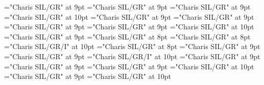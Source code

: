 \documentclass[gps1,twoside]{article}
\begin{document}
\font\pronunciationssubentrysubentriesentryletData="Charis SIL/GR" at 9pt
\font\pronunciationpronunciationssubentrysubentriesentryletData="Charis SIL/GR" at 9pt
\font\formpronunciationpronunciationssubentrysubentriesentryletData="Charis SIL/GR" at 9pt
\font\spanbzhfonipaformpronunciationpronunciationssubentrysubentriesentryletData="Charis SIL/GR" at 10pt
\font\sensessubentrysubentriesentryletData="Charis SIL/GR" at 9pt
\font\sensecontentsensessubentrysubentriesentryletData="Charis SIL/GR" at 9pt
\font\sensesensecontentsensessubentrysubentriesentryletData="Charis SIL/GR" at 9pt
\font{}="Charis SIL/GR" at 9pt
\font\spanendefinitionorglosssensesensecontentsensessubentrysubentriesentryletData="Charis SIL/GR" at 10pt
\font\examplessensesensecontentsensessubentrysubentriesentryletData="Charis SIL/GR" at 9pt
\font\exampleexamplessensesensecontentsensessubentrysubentriesentryletData="Charis SIL/GR" at 8pt
\font\exampleexampleexamplessensesensecontentsensessubentrysubentriesentryletData="Charis SIL/GR" at 8pt
\font\spanbzhexampleexampleexamplessensesensecontentsensessubentrysubentriesentryletData="Charis SIL/GR/I" at 10pt
\font\translationsexampleexamplessensesensecontentsensessubentrysubentriesentryletData="Charis SIL/GR" at 8pt
\font\translationtranslationsexampleexamplessensesensecontentsensessubentrysubentriesentryletData="Charis SIL/GR" at 9pt
\font\translationtranslationtranslationsexampleexamplessensesensecontentsensessubentrysubentriesentryletData="Charis SIL/GR" at 9pt
\font\spanentranslationtranslationtranslationsexampleexamplessensesensecontentsensessubentrysubentriesentryletData="Charis SIL/GR/I" at 10pt
\font\semanticdomainssensesensecontentsensessubentrysubentriesentryletData="Charis SIL/GR" at 9pt
\font\semanticdomainsemanticdomainssensesensecontentsensessubentrysubentriesentryletData="Charis SIL/GR" at 9pt
\font\abbreviationsemanticdomainsemanticdomainssensesensecontentsensessubentrysubentriesentryletData="Charis SIL/GR" at 9pt
\font\spanenabbreviationsemanticdomainsemanticdomainssensesensecontentsensessubentrysubentriesentryletData="Charis SIL/GR" at 10pt
\font\namesemanticdomainsemanticdomainssensesensecontentsensessubentrysubentriesentryletData="Charis SIL/GR" at 9pt
\font\spanennamesemanticdomainsemanticdomainssensesensecontentsensessubentrysubentriesentryletData="Charis SIL/GR" at 10pt
\end{document}
